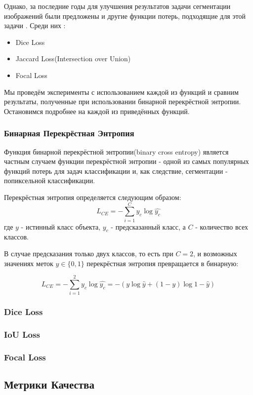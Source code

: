 Однако, за последние годы для улучшения результатов задачи сегментации изображений были предложены и другие функции потерь, подходящие для 
этой задачи \cite{Loss-Functions}. Среди них : 

\begin{itemize}
    \item Dice Loss \cite{Dice-Loss}
    \item Jaccard Loss(Intersection over Union) \cite{IoU-Loss}
    \item Focal Loss \cite{Focal-Loss}
\end{itemize}

Мы проведём эксперименты с использованием каждой из функций и сравним результаты, полученные при использовании бинарной перекрёстной энтропии.
Остановимся подробнее на каждой из приведённых функций.

\subsubsection{Бинарная Перекрёстная Энтропия}

Функция бинарной перекрёстной энтропии(binary cross entropy) является частным случаем функции перекрёстной энтропии - одной из самых популярных 
функций потерь для задач классификации и, как следствие, сегментации - попиксельной классификации.

Перекрёстная энтропия \cite{CE} определяется следующим образом: 
\begin{equation}
    L_{CE} = -\sum_{i=1}^{C}y_c\log{\hat{y_c}}
\end{equation}
где $y$ - истинный класс объекта, $y_c$ - предсказанный класс, а $C$ - количество 
всех классов.

В случае предсказания только двух классов, то есть при $C=2$, 
и возможных значениях меток $y \in \{0,1\}$
перекрёстная энтропия превращается в бинарную:

\begin{equation}
    L_{CE} = -\sum_{i=1}^{2}y_c\log{\hat{y_c}} = 
    -(y\log{\hat{y}} + (1-y)\log{1-\hat{y}})
\end{equation}


\subsubsection{Dice Loss} 

\subsubsection{IoU Loss}

\subsubsection{Focal Loss}


\subsection{Метрики Качества}

